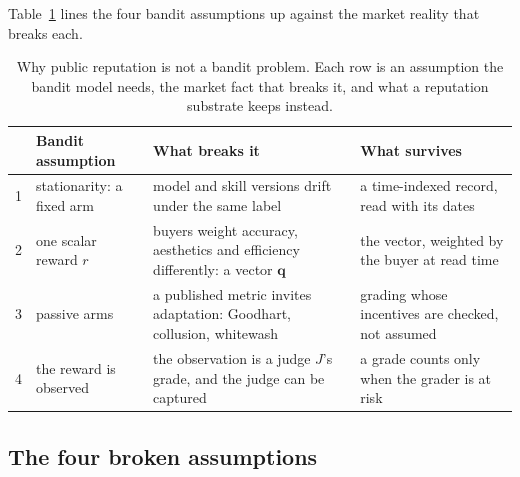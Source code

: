 \documentclass[11pt,a4paper]{article}
\theoremstyle{definition}
\begin{document}
Table~\ref{tab:stp-not-bandit} lines the four bandit assumptions up against the market
reality that breaks each.
\begin{table}[H]
\centering
\caption{Why public reputation is not a bandit problem. Each row is an assumption the bandit model needs, the market fact that breaks it, and what a reputation substrate keeps instead.}
\label{tab:stp-not-bandit}
\small
\renewcommand{\arraystretch}{1.15}
\begin{tabularx}{\linewidth}{@{}l >{\raggedright\arraybackslash}X >{\raggedright\arraybackslash}X >{\raggedright\arraybackslash}X@{}}
\toprule
& \textbf{Bandit assumption} & \textbf{What breaks it} & \textbf{What survives} \\
\midrule
1 & stationarity: a fixed arm & model and skill versions drift under the same label & a time-indexed record, read with its dates \\
2 & one scalar reward $r$ & buyers weight accuracy, aesthetics and efficiency differently: a vector $\mathbf q$ & the vector, weighted by the buyer at read time \\
3 & passive arms & a published metric invites adaptation: Goodhart, collusion, whitewash & grading whose incentives are checked, not assumed \\
4 & the reward is observed & the observation is a judge $J$'s grade, and the judge can be captured & a grade counts only when the grader is at risk \\
\bottomrule
\end{tabularx}
\end{table}

\subsection{The four broken assumptions}
\end{document}
